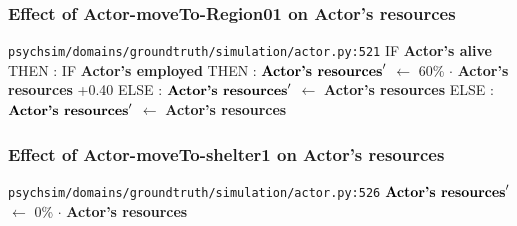 \documentclass{article}%
\begin{document}
%
\subsubsection{Effect of Actor{-}moveTo{-}Region01 on Actor's resources}%
\label{ssubsec:Effect of Actor{-}moveTo{-}Region01 on Actor's resources}%
\begin{flushleft}%
\verb|psychsim/domains/groundtruth/simulation/actor.py:521|%
\linebreak%
IF %
\textbf{Actor's alive}%
\linebreak%
\hspace*{2em}%
THEN %
: %
IF %
\textbf{Actor's employed}%
\linebreak%
\hspace*{4em}%
THEN %
: %
$\mbox{\textbf{Actor's resources}} '$%
$\leftarrow$%
60\%%
$\cdot$%
\textbf{Actor's resources}%
+0.40%
\linebreak%
\hspace*{4em}%
ELSE %
: %
$\mbox{\textbf{Actor's resources}} '$%
$\leftarrow$%
\textbf{Actor's resources}%
\linebreak%
\hspace*{2em}%
ELSE %
: %
$\mbox{\textbf{Actor's resources}} '$%
$\leftarrow$%
\textbf{Actor's resources}%
\end{flushleft}

%
\subsubsection{Effect of Actor{-}moveTo{-}shelter1 on Actor's resources}%
\label{ssubsec:Effect of Actor{-}moveTo{-}shelter1 on Actor's resources}%
\begin{flushleft}%
\verb|psychsim/domains/groundtruth/simulation/actor.py:526|%
\linebreak%
$\mbox{\textbf{Actor's resources}} '$%
$\leftarrow$%
0\%%
$\cdot$%
\textbf{Actor's resources}%
\end{flushleft}

%
\end{document}

